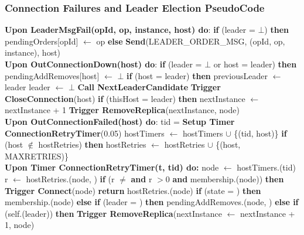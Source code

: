 \documentclass[sigconf]{acmart}
\begin{document}
\subsubsection{Connection Failures and Leader Election PseudoCode}
\begin{algorithmic}[1]
\small
\State \textbf{Upon LeaderMsgFail(opId, op, instance, host) do}:
\State \quad \textbf{if} (leader = $\bot$) \textbf{then}
\State \quad \quad pendingOrders[opId] $\gets$ op
\State \quad \textbf{else}
\State \quad \quad \textbf{Send}(LEADER\_ORDER\_MSG, (opId, op, instance), host) \\

\State \textbf{Upon OutConnectionDown(host) do}:
\State \quad \textbf{if} (leader = $\bot$ or host = leader) \textbf{then}
\State \quad \quad pendingAddRemoves[host] $\gets$ $\bot$
\State \quad \textbf{if} (host = leader) \textbf{then}
\State \quad \quad previousLeader $\gets$ leader
\State \quad \quad leader $\gets$ $\bot$
\State \quad \quad \textbf{Call NextLeaderCandidate}
\State \quad \textbf{Trigger CloseConnection}(host)
\State \quad \textbf{if} (thisHost = leader) \textbf{then}
\State \quad \quad nextInstance $\gets$ nextInstance + 1 
\State \quad \quad \textbf{Trigger RemoveReplica}(nextInstance, node) \\

\State \textbf{Upon OutConnectionFailed(host) do}:
\State \quad tid = \textbf{Setup Timer ConnectionRetryTimer}(0.05)
\State \quad hostTimers $\gets$ hostTimers $\cup$ \{(tid, host)\}
\State \quad \textbf{if} (host $\notin$ hostRetries) \textbf{then}
\State \quad \quad hostRetries $\gets$ hostRetries $\cup$ \{(host, MAXRETRIES)\} \\

\State \textbf{Upon Timer ConnectionRetryTimer(t, tid) do:}
\State \quad node $\gets$ hostTimers.(tid)
\State \quad r $\gets$ hostRetries.(node, )
\State \quad \textbf{if} (r $\neq$  \textbf{and} r $> 0$ \textbf{and} membership.(node)) \textbf{then}
\State \quad \quad \textbf{Trigger Connect}(node)
\State \quad \quad \textbf{return}
\State \quad hostRetries.(node)
\State \quad \textbf{if} (state = ) \textbf{then}
\State \quad \quad membership.(node)
\State \quad \textbf{else if} (leader = ) \textbf{then}
\State \quad \quad pendingAddRemoves.(node, )
\State \quad \textbf{else if} (self.(leader)) \textbf{then}
\State \quad \quad \textbf{Trigger RemoveReplica}(nextInstance $\gets$ nextInstance + 1, node) \\


\end{algorithmic}
\end{document}
